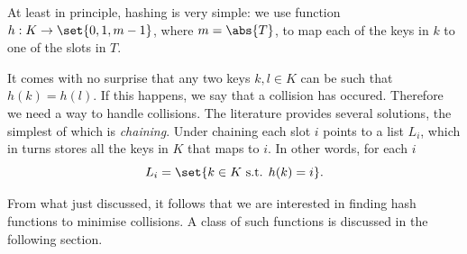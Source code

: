 \documentclass{subfiles}
\begin{document}
    At least in principle, hashing is very simple: 
        we use function \(h : K \to \set{0, 1, m - 1}\), where \(m = \abs{T}\),
        to map each of the keys in \(k\) to one of the slots in \(T\).

    It comes with no surprise that any two keys \(k, l \in K\) can be such that \(h(k) = h(l)\).
        If this happens, we say that a collision has occured. 
        Therefore we need a way to handle collisions. The literature provides several solutions,
        the simplest of which is \emph{chaining}. Under chaining each slot \(i\) points to a list \(L_{i}\),
        which in turns stores all the keys in \(K\) that maps to \(i\).
        In other words, for each \(i\)
        \[
            L_{i} = \set{k \in K \text{ s.t. } h(k) = i}.
        \]

    From what just discussed,
        it follows that we are interested in finding hash functions to minimise collisions.
        A class of such functions is discussed in the following section.
\end{document}
